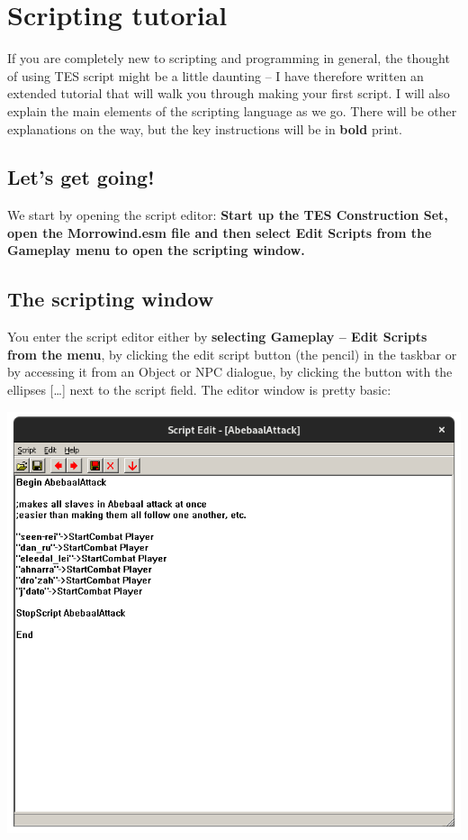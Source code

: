 \section{Scripting tutorial}

If you are completely new to scripting and programming in general, the thought of using TES script might be a little daunting -- I have therefore written an extended tutorial that will walk you through making your first script. I will also explain the main elements of the scripting language as we go. There will be other explanations on the way, but the key instructions will be in \textbf{bold} print.

\hypertarget{lets-get-going}{%
\subsection{Let's get going!}\label{lets-get-going}}

We start by opening the script editor: \textbf{Start up the TES Construction Set, open the Morrowind.esm file and then select Edit Scripts from the Gameplay menu to open the scripting window.}

\hypertarget{the-scripting-window}{%
\subsection{The scripting window}\label{the-scripting-window}}

You enter the script editor either by \textbf{selecting Gameplay -- Edit Scripts from the menu}, by clicking the edit script button (the pencil) in the taskbar or by accessing it from an Object or NPC dialogue, by clicking the button with the ellipses {[}\ldots{]} next to the script field. The editor window is pretty basic:

\includegraphics{media/script-abebaal-attack.png}


